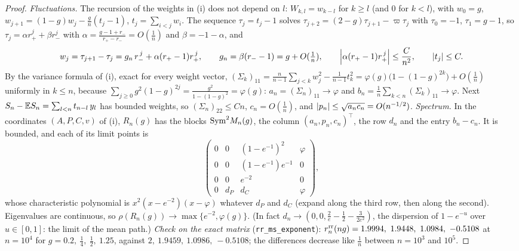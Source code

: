 \begin{proof}
\emph{Fluctuations.} The recursion of the weights in (i) does not depend on $l$: $W_{k,l}=w_{k-l}$ for $k\ge l$ (and $0$ for $k<l$), with $w_0=g$, $w_{j+1}=(1-g)w_j-\frac gn(t_j-1)$, $t_j=\sum_{i<j}w_i$. The sequence $\tau_j=t_j-1$ solves $\tau_{j+2}=(2-g)\tau_{j+1}-\varpi\tau_j$ with $\tau_0=-1$, $\tau_1=g-1$, so $\tau_j=\alpha r_+^j+\beta r_-^j$ with $\alpha=\frac{g-1+r_-}{r_+-r_-}=O(\frac1n)$ and $\beta=-1-\alpha$, and
\[
w_j=\tau_{j+1}-\tau_j=g_n\,r_-^{\,j}+\alpha(r_+-1)r_+^{\,j},\qquad g_n=\beta(r_--1)=g+O(\tfrac1n),\qquad \left|\alpha(r_+-1)r_+^{\,j}\right|\le\frac C{n^2},\qquad \left|t_j\right|\le C .
\]
By the variance formula of (i), exact for every weight vector, $(\Sigma_k)_{11}=\frac n{n-1}\sum_{j<k}w_j^2-\frac1{n-1}t_k^2=\varphi(g)\big(1-(1-g)^{2k}\big)+O(\frac1n)$ uniformly in $k\le n$, because $\sum_{j\ge0}g^2(1-g)^{2j}=\frac{g^2}{1-(1-g)^2}=\varphi(g)$: $a_n=(\Sigma_n)_{11}\to\varphi$ and $b_n=\frac1n\sum_{k<n}(\Sigma_k)_{11}\to\varphi$. Next $S_n-\mathbb{E} S_n=\sum_{l<n}t_{n-l}\,y_l$ has bounded weights, so $(\Sigma_n)_{22}\le Cn$, $c_n=O(\frac1n)$, and $\left|p_n\right|\le\sqrt{a_nc_n}=O(n^{-1/2})$.
\emph{Spectrum.} In the coordinates $(A,P,C,v)$ of (i), $R_n(g)$ has the blocks ${\rm Sym}^2M_n(g)$, the column $(a_n,p_n,c_n)^\top$, the row $d_n$ and the entry $b_n-c_n$. It is bounded, and each of its limit points is
\[
\begin{pmatrix}0&0&(1-e^{-1})^2&\varphi\\0&0&(1-e^{-1})e^{-1}&0\\0&0&e^{-2}&0\\0&d_P&d_C&\varphi\end{pmatrix},
\]
whose characteristic polynomial is $x^2(x-e^{-2})(x-\varphi)$ whatever $d_P$ and $d_C$ (expand along the third row, then along the second). Eigenvalues are continuous, so $\rho(R_n(g))\to\max\{e^{-2},\varphi(g)\}$. (In fact $d_n\to(0,0,\frac2e-\frac12-\frac3{2e^2})$, the dispersion of $1-e^{-u}$ over $u\in[0,1]$: the limit of the mean path.)
\emph{Check on the exact matrix} (\texttt{rr\_ms\_exponent}): $r^{\rm rr}_n(ng)=1.9994,\ 1.9448,\ 1.0984,\ -0.5108$ at $n=10^4$ for $g=0.2,\ \frac14,\ \frac12,\ 1.25$, against $2,\ 1.9459,\ 1.0986,\ -0.5108$; the differences decrease like $\frac1n$ between $n=10^3$ and $10^5$.
\end{proof}

